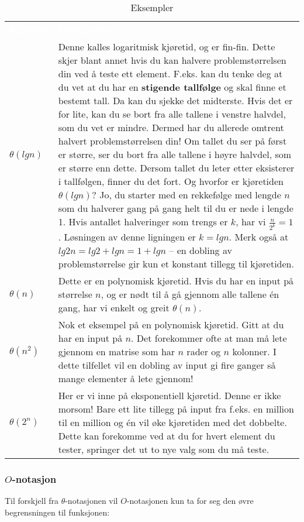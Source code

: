 \begin{table}[H]
    \caption{Eksempler}
    \label{tab:kjoretideks}
    \centering
    \begin{tabular}{|L{5em} | L{35em}|}
        \hline
        \textbf{\textcolor{white}{Kjøretid}} & \textbf{\textcolor{white}{Beskrivelse}}\\
        $\theta(lg n)$ & Denne kalles logaritmisk kjøretid, og er fin-fin. Dette skjer blant annet hvis du kan halvere problemstørrelsen din ved å teste ett element. F.eks. kan du tenke deg at du vet at du har en \textbf{stigende tallfølge} og skal finne et bestemt tall. Da kan du sjekke det midterste. Hvis det er for lite, kan du se bort fra alle tallene i venstre halvdel, som du vet er mindre. Dermed har du allerede omtrent halvert problemstørrelsen din! Om tallet du ser på først er større, ser du bort fra alle tallene i høyre halvdel, som er større enn dette. Dersom tallet du leter etter eksisterer i tallfølgen, finner du det fort. Og hvorfor er kjøretiden $\theta(lg n)$? Jo, du starter med en rekkefølge med lengde $n$ som du halverer gang på gang helt til du er nede i lengde 1. Hvis antallet halveringer som trengs er $k$, har vi \(\frac{n}{2^k}\)$ = 1$. Løsningen av denne ligningen er $k = lg n$. Merk også at $lg 2n = lg 2 + lg n = 1 + lg n$ – en dobling av problemstørrelse gir kun et konstant tillegg til kjøretiden. \\
        $\theta(n)$ & Dette er en polynomisk kjøretid. Hvis du har en input på størrelse $n$, og er nødt til å gå gjennom alle tallene én gang, har vi enkelt og greit $\theta(n)$.\\
        $\theta(n^2)$ & Nok et eksempel på en polynomisk kjøretid. Gitt at du har en input på $n$. Det forekommer ofte at man må lete gjennom en matrise som har $n$ rader og $n$ kolonner. I dette tilfellet vil en dobling av input gi fire ganger så mange elementer å lete gjennom!\\
        $\theta(2^n)$ & Her er vi inne på eksponentiell kjøretid. Denne er ikke morsom! Bare ett lite tillegg på input fra f.eks. en million til en million og én vil øke kjøretiden med det dobbelte. Dette kan forekomme ved at du for hvert element du tester, springer det ut to nye valg som du må teste.\\
         \hline
    \end{tabular}
\end{table}

\subsubsection{$O$-notasjon}
Til forskjell fra $\theta$-notasjonen vil $O$-notasjonen kun ta for seg den øvre begrensningen til funksjonen:

